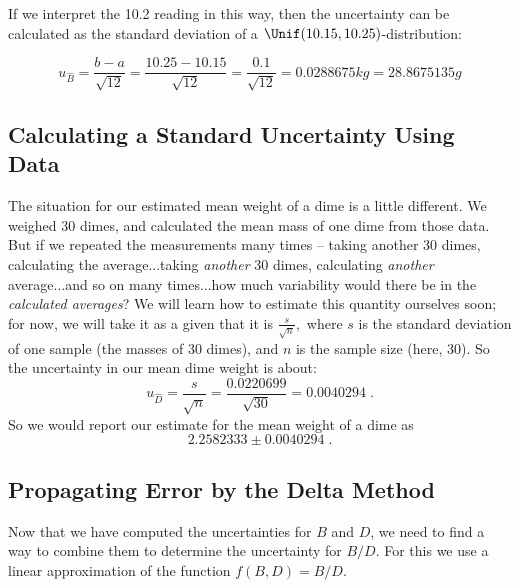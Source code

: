 \documentclass[twoside]{book}\usepackage[]{graphicx}\usepackage[]{xcolor}
\begin{document}
If we interpret the 10.2 reading in this way, then the uncertainty can be
calculated as the standard deviation of a $\Unif(10.15, 10.25)$-distribution:  

\[
u_{\hat B} = \frac{b-a}{\sqrt{12}} 
= \frac{10.25-10.15}{\sqrt{12}} 
= \frac{0.1}{\sqrt{12}} 
= 0.0288675 kg
= 28.8675135 g
\]

\subsection{Calculating a Standard Uncertainty Using Data}

The situation for our estimated mean weight of a dime is a little different.  We weighed 30 dimes, and calculated the mean mass of one dime from those data.  But if we repeated the measurements many times -- taking another 30 dimes, calculating the average...taking \emph{another} 30 dimes, calculating \emph{another} average...and so on many times...how much variability would there be in the \emph{calculated averages}?  We will learn how to estimate this quantity ourselves soon; for now, we will take it as a given that it is $\frac{s}{\sqrt{n}},$ where $s$ is the standard deviation of one sample (the masses of 30 dimes), and $n$ is the sample size (here, 30). So the uncertainty in our mean dime weight is about:
%  
% 
\[
u_{\hat D} = \frac{s}{\sqrt{n}} 
= \frac{0.0220699}{\sqrt{30}} 
= 0.0040294\;.
\]
So we would report our estimate for the mean weight of a dime as 
\[
2.2582333 \pm 0.0040294 \;.
\]



\subsection{Propagating Error by the Delta Method}
Now that we have computed the uncertainties for $B$ and $D$, we need to find a way to combine
them to determine the uncertainty for $B/D$.  For this we use a linear approximation of the function $f(B,D) = B/D$.
\end{document}
